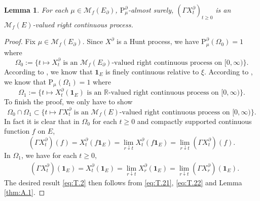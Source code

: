 \documentclass[12pt,a4paper]{amsart}
\numberwithin{equation}{section}
\theoremstyle{plain}
\newtheorem{lem}[thm]{Lemma}
\theoremstyle{definition}
\theoremstyle{remark}
\begin{document}
\begin{lem} \label{thm:T.2}
	For each $\mu \in \mathcal M_f(E_\partial)$, $\mathrm P_\mu^\partial$-almost surely, $(\Gamma X^\partial_t)_{t\geq 0}$ is an $\mathcal M_f(E)$-valued right continuous process.
\end{lem}
\begin{proof}
	Fix $\mu\in \mathcal M_f(E_\partial)$.
	Since $X^\partial$ is a Hunt process, we have $\mathrm P_\mu^\partial(\Omega_0) = 1$ where
\[
	\Omega_0 := \{t\mapsto X_t^\partial \text{ is an $\mathcal M_f(E_\partial)$-valued right continuous process on $[0,\infty)$}\}.
\]
	According to \cite[Theorem A.20]{Li2011Measure-valued}, we know that $\mathbf 1_E$ is finely continuous relative to $\xi$.
	According to \cite[Proposition 5.9]{Li2011Measure-valued}, we know that
$
	\mathrm P_\mu(\Omega_1) = 1
$
	where
\[
	\Omega_1 := \{t \mapsto X_t^\partial(\mathbf 1_E) \text{ is an $\mathbb R$-valued right continuous process on $[0,\infty)$}\}.
\]
	To finish the proof, we only have to show
\begin{equation} \label{eq:T.2}
	\Omega_0\cap \Omega_1
	\subset \{t\mapsto \Gamma X_t^\partial \text{ is an $\mathcal M_f(E)$-valued right continuous process on $[0,\infty)$}\}.
\end{equation}
	In fact it is clear that in $\Omega_0$ for each $t\geq 0$ and compactly supported continuous function $f$ on $E$,
\begin{equation}\label{eq:T.21}
	(\Gamma X^\partial_t)(f) = X^\partial_t(f\mathbf 1_E) = \lim_{r\downarrow t} X^\partial_t(f\mathbf 1_E) = \lim_{r\downarrow t} (\Gamma X^\partial_t)(f).
\end{equation}
	In $\Omega_1$, we have for each $t\geq 0$,
\begin{align} \label{eq:T.22}
	&(\Gamma X^\partial_t)(\mathbf 1_E)
	= X^\partial_t(\mathbf 1_E)
	= \lim_{r\downarrow t} X^\partial_r (\mathbf 1_{E})
	= \lim_{r\downarrow t} (\Gamma X^\partial_r)(\mathbf 1_E).
\end{align}
	The desired result \eqref{eq:T.2} then follows from \eqref{eq:T.21}, \eqref{eq:T.22} and Lemma \ref{thm:A.1}.
\end{proof}
\end{document}
